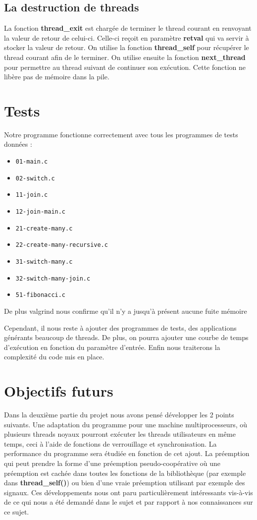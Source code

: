 \documentclass{article}
\begin{document}
\subsection{La destruction de threads}
La fonction \textbf{thread\_exit} est chargée de terminer le thread courant en
renvoyant la valeur de retour de celui-ci.
Celle-ci reçoit en paramètre \textbf{retval} qui va servir à stocker la valeur
de retour. On utilise la fonction \textbf{thread\_self} pour récupérer le
thread courant afin de le terminer.
On utilise ensuite la fonction \textbf{next\_thread} pour permettre au thread
suivant de continuer son exécution.
Cette fonction ne libère pas de mémoire dans la pile.

\section{Tests}

Notre programme fonctionne correctement avec tous les programmes de tests
données : 
\begin{itemize}
\item \verb!01-main.c!
\item \verb!02-switch.c!	
\item \verb!11-join.c!	
\item \verb!12-join-main.c!	
\item \verb!21-create-many.c!	
\item \verb!22-create-many-recursive.c!	
\item \verb!31-switch-many.c!	
\item \verb!32-switch-many-join.c!	
\item \verb!51-fibonacci.c!	
\end{itemize}
De plus valgrind nous confirme qu'il n'y a jusqu'à présent aucune fuite mémoire

Cependant, il nous reste à ajouter des programmes de tests, des applications
générants beaucoup de threads. De plus, on pourra ajouter une courbe de temps
d'exécution en fonction du paramètre d'entrée.
Enfin nous traiterons la complexité du code mis en place.


\section{Objectifs futurs}
Dans la deuxième partie du projet nous avons pensé développer les 2 points
suivants.
Une adaptation du programme pour une machine multiprocesseurs, où plusieurs
threads noyaux pourront exécuter les threads utilisateurs en même temps, ceci à
l’aide de fonctions de verrouillage et synchronisation.
La performance du programme sera étudiée en fonction de cet ajout.
La préemption qui peut prendre la forme d’une préemption pseudo-coopérative où
une préemption est cachée dans toutes les fonctions de la bibliothèque (par
exemple dans \textbf{thread\_self()}) ou bien d’une vraie préemption utilisant
par exemple des signaux.
Ces développements nous ont paru particulièrement intéressants vis-à-vis de ce
qui nous a été demandé dans le sujet et par rapport à nos connaissances sur ce
sujet.
\end{document}
